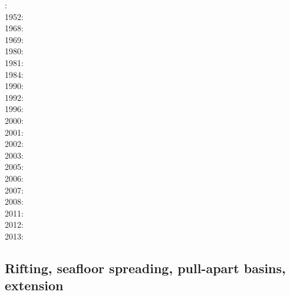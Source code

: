 : \cite{druc51}\cite{hafn51}\\
1952: \cite{drpr52}\\
1968: \cite{byer68}\\
1969: \cite{hand69}\\
1980: \cite{brko80}\\
1981: \cite{delo81}\\
1984: \cite{rafi84}\\
1990: \cite{wica90}\\
1992: \cite{bako92}\\
1996: \cite{wasd96}\\
2000: \cite{rydr00}\cite{rana00}\\
2001: \cite{lova01}\\
2002: \cite{hirt02}\\
2003: \cite{hiko03}\\
2005: \cite{didr05}\cite{drur05}\\
2006: \cite{rygw06}\cite{buwa06}\\
2007: \cite{hirw07}\\
2008: \cite{lemm08}\cite{budr08}\\
2011: \cite{lell11}\\
2012: \cite{reyn12}\\
2013: \cite{lepo13}


\subsection*{Rifting, seafloor spreading, pull-apart basins, extension}

